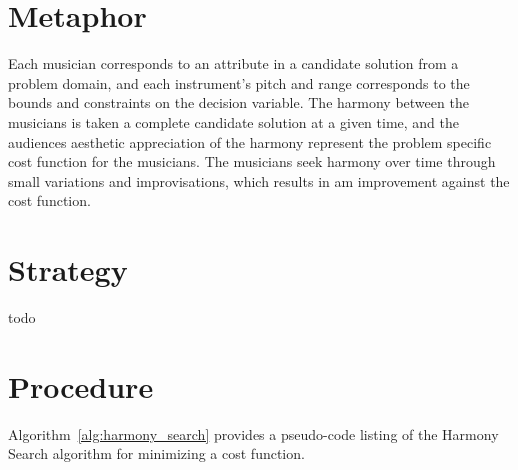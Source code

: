 \documentclass[a4paper, 11pt]{article}
\begin{document}
\section{Metaphor}
\label{sec:metaphor}
Each musician corresponds to an attribute in a candidate solution from a problem domain, and each instrument's pitch and range corresponds to the bounds and constraints on the decision variable. The harmony between the musicians is taken a complete candidate solution at a given time, and the audiences aesthetic appreciation of the harmony represent the problem specific cost function for the musicians. The musicians seek harmony over time through small variations and improvisations, which results in am improvement against the cost function.

\section{Strategy}
\label{sec:strategy}
todo

\section{Procedure}
\label{sec:procedure}
Algorithm~\ref{alg:harmony_search} provides a pseudo-code listing of the Harmony Search algorithm for minimizing a cost function. 
\end{document}
